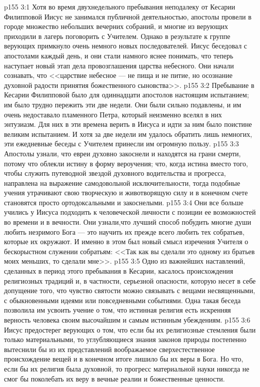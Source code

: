 \vs p155 3:1 Хотя во время двухнедельного пребывания неподалеку от Кесарии Филипповой Иисус не занимался публичной деятельностью, апостолы провели в городе множество небольших вечерних собраний, и многие из верующих приходили в лагерь поговорить с Учителем. Однако в результате к группе верующих примкнуло очень немного новых последователей. Иисус беседовал с апостолами каждый день, и они стали намного яснее понимать, что теперь наступает новый этап дела провозглашения царства небесного. Они начали сознавать, что <<царствие небесное --- не пища и не питие, но осознание духовной радости принятия божественного сыновства>>.
\vs p155 3:2 Пребывание в Кесарии Филипповой было для одиннадцати апостолов настоящим испытанием; им было трудно пережить эти две недели. Они были сильно подавлены, и им очень недоставало пламенного Петра, который неизменно вселял в них энтузиазм. Для них в эти времена верить в Иисуса и идти за ним было поистине великим испытанием. И хотя за две недели им удалось обратить лишь немногих, эти ежедневные беседы с Учителем принесли им огромную пользу.
\vs p155 3:3 Апостолы узнали, что евреи духовно закоснели и находятся на грани смерти, потому что облекли истину в форму вероучения; что, когда истина вместо того, чтобы служить путеводной звездой духовного водительства и прогресса, направлена на выражение самодовольной исключительности, тогда подобные учения утрачивают свою творческую и животворящую силу и в конечном счете становятся просто ортодоксальными и закоснелыми.
\vs p155 3:4 Они все больше учились у Иисуса подходить к человеческой личности с позиции ее возможностей во времени и в вечности. Они узнали,что лучший способ побудить многие души любить незримого Бога --- это научить их прежде всего любить тех собратьев, которые их окружают. И именно в этом был новый смысл изречения Учителя о бескорыстном служении собратьям: <<Так как вы сделали это одному из братьев моих меньших, то сделали мне>>.
\vs p155 3:5 Одно из важнейших наставлений, сделанных в период этого пребывания в Кесарии, касалось происхождения религиозных традиций и, в частности, серьезной опасности, которую несет в себе допущение того, что чувство святости можно связывать с вещами несвященными, с обыкновенными идеями или повседневными событиями. Одна такая беседа позволила им усвоить учение о том, что истинная религия есть искренняя верность человека своим высочайшим и самым истинным убеждениям.
\vs p155 3:6 Иисус предостерег верующих о том, что если бы их религиозные стемления были только материальными, то углубляющиеся знания законов природы постепенно вытеснили бы из их представлений воображаемое сверхестественное происхождение вещей и в конечном итоге лишило бы их веры в Бога. Но что, если бы их религия была духовной, то прогресс материальной науки никогда не смог бы поколебать их веру в вечные реалии и божественные ценности.

